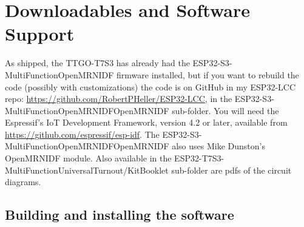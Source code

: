 %
%
%
%
% 
%
%
%
%
%
% 
%

\section{Downloadables and Software Support}

As shipped, the TTGO-T7S3 has already had the ESP32-S3-MultiFunctionOpenMRNIDF
firmware installed, but if you want to rebuild the code (possibly with
customizations) the code is on GitHub in my ESP32-LCC repo:
\url{https://github.com/RobertPHeller/ESP32-LCC}, in the
ESP32-S3-MultiFunctionOpenMRNIDFOpenMRNIDF sub-folder. You will need the
Espressif's IoT Development Framework, version 4.2 or later, available from
\url{https://github.com/espressif/esp-idf}. The
ESP32-S3-MultiFunctionOpenMRNIDFOpenMRNIDF also uses Mike Dunston's OpenMRNIDF
module. Also available in the 
ESP32-T7S3-MultiFunctionUniversalTurnout/KitBooklet sub-folder are pdfs of the 
circuit diagrams.

\subsection{Building and installing the software}

